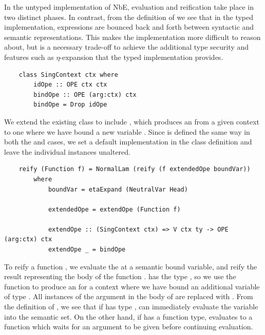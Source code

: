 In the untyped implementation of NbE, evaluation and reification take place in two distinct phases. In contrast, from the definition of  we see that in the typed implementation, expressions are bounced back and forth between syntactic and semantic representations. This makes the implementation more difficult to reason about, but is a necessary trade-off to achieve the additional type security and features such as $\eta$-expansion that the typed implementation provides.

\begin{lstlisting}
    class SingContext ctx where
        idOpe :: OPE ctx ctx
        bindOpe :: OPE (arg:ctx) ctx
        bindOpe = Drop idOpe
\end{lstlisting}

We extend the existing class  to include , which produces an  from a given context  to one where we have bound a new variable . Since  is defined the same way in both the  and \code{(:)} cases, we set a default implementation in the class definition and leave the individual instances unaltered. 

\begin{lstlisting}
    reify (Function f) = NormalLam (reify (f extendedOpe boundVar)) 
        where
            boundVar = etaExpand (NeutralVar Head)

            extendedOpe = extendOpe (Function f)

            extendOpe :: (SingContext ctx) => V ctx ty -> OPE (arg:ctx) ctx
            extendOpe _ = bindOpe 
\end{lstlisting}

To reify a function , we evaluate the  at a semantic bound variable, and reify the result representing the body of the function .  has the type , so we use the  function to produce an  for a context where we have bound an additional variable of type . All instances of the argument in the body of  are replaced with . From the definition of , we see that if  has type ,  can immediately evaluate the variable into the semantic set. On the other hand, if  has a function type,  evaluates to a function which waits for an argument to be given before continuing evaluation.

